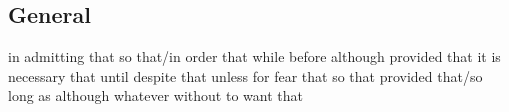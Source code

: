 \subsection*{General}
   {in admitting that}
   {so that/in order that}
   {while}
   {before}
   {although}
   {provided that}
   {it is necessary that}
   {until}
   {despite that}
   {unless}   
   {for fear that}
   {so that}
   {provided that/so long as}
   {although}
   {whatever}
   {without}
   {to want that}



